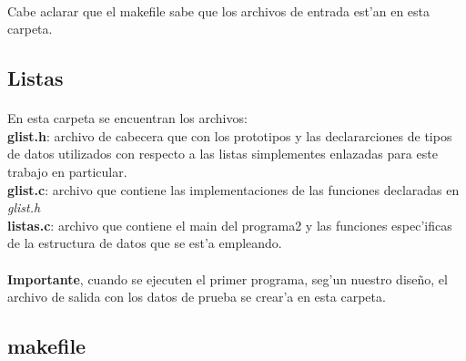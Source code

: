 \documentclass{article}
\begin{document}
	\paragraph{}
	Cabe aclarar que el makefile sabe que los archivos de entrada est'an en esta carpeta.
	
	\subsection{Listas}
	\paragraph{}
	En esta carpeta se encuentran los archivos: \\
	\textbf{glist.h}: archivo de cabecera que con los prototipos y las declararciones de tipos de datos utilizados con respecto a las listas simplementes enlazadas para este trabajo en particular.\\
	\textbf{glist.c}: archivo que contiene las implementaciones de las funciones declaradas en \emph{glist.h}\\
	\textbf{listas.c}: archivo que contiene el main del programa2 y las funciones espec'ificas de la estructura de datos que se est'a empleando.\\
	\paragraph{}
	\textbf{Importante}, cuando se ejecuten el primer programa, seg'un nuestro diseño, el archivo de salida con los datos de prueba se crear'a en esta carpeta.
	
	\subsection{makefile}
\end{document}
